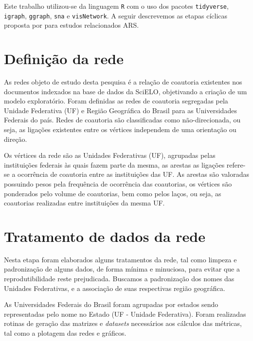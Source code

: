 Este trabalho utilizou-se da linguagem \texttt R com o uso dos pacotes \texttt{tidyverse}, \texttt{igraph}, \texttt{ggraph}, \texttt{sna} e \texttt{visNetwork}. A seguir descrevemos as etapas cíclicas proposta por \citep{de2018exploratory} para estudos relacionados ARS.

\section{\textbf{Definição da rede}}

As redes objeto de estudo desta pesquisa é a relação de coautoria existentes nos documentos indexados na base de dados da SciELO, objetivando a criação de um modelo exploratório. Foram definidas as redes de coautoria segregadas pela Unidade Federativa (UF) e Região Geográfica do Brasil para as Universidades Federais do país. Redes de coautoria são classificadas como não-direcionada, ou seja, as ligações existentes entre os vértices independem de uma orientação ou direção.

Os vértices da rede são as Unidades Federativas (UF), agrupadas pelas instituições federais às quais fazem parte da mesma, as arestas as ligações refere-se a ocorrência de coautoria entre as instituições das UF. As arestas são valoradas possuindo pesos pela frequência de ocorrência das coautorias, os vértices são ponderados pelo volume de coautorias, bem como pelos laços, ou seja, as coautorias realizadas entre instituições da mesma UF. %


\section{\textbf{Tratamento de dados da rede}}

Nesta etapa foram elaborados alguns tratamentos da rede, tal como limpeza e padronização de alguns dados, de forma mínima e minuciosa, para evitar que a reprodutibilidade reste prejudicada. Buscamos a padronização dos nomes das Unidades Federativas, e a associação de suas respectivas região geográfica.

As Universidades Federais do Brasil foram agrupadas por estados sendo representadas pelo nome no Estado (UF - Unidade Federativa). Foram realizadas rotinas de geração das matrizes e \textit{datasets} necessários aos cálculos das métricas, tal como a plotagem das redes e gráficos.

